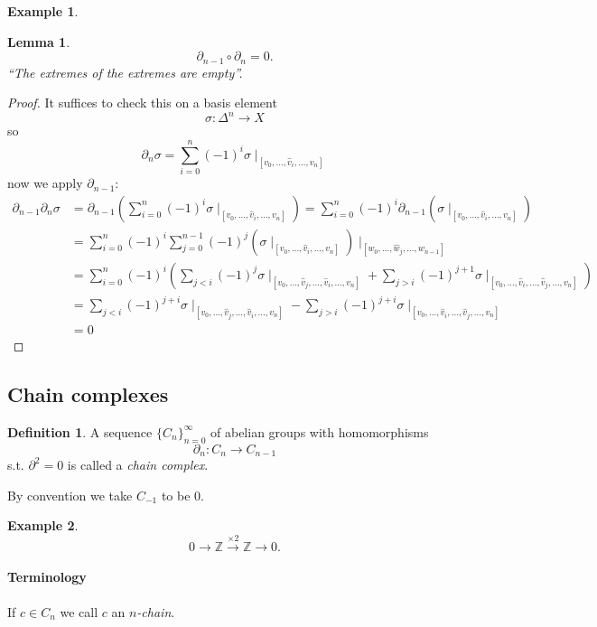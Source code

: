 \documentclass{article}
\newtheorem*{lem}{Lemma}
\theoremstyle{definition}
\newtheorem*{defn}{Definition}
\newtheorem*{ex}{Example}
\newcommand{\ZZ}{\mathbb{Z}}
\begin{document}
\begin{ex}
\end{ex}

\begin{lem}
\[\partial_{n-1} \circ \partial_n = 0.\]
``The extremes of the extremes are empty''.
\end{lem}
\begin{proof}
It suffices to check this on a basis element
\[\sigma \colon \Delta^n \to X\]
so
\[\partial_n \sigma = \sum_{i=0}^{n} (-1)^i \sigma \mid_{[v_0, \ldots, \hat{v}_i,\ldots,v_n]}\]
now we apply $\partial_{n-1}$:
\begin{align*}
\partial_{n-1} \partial_n \sigma &= \partial_{n-1} \left(\sum_{i=0}^{n} (-1)^i \sigma \mid_{[v_0, \ldots, \hat{v}_i,\ldots,v_n]} \right) = \sum_{i=0}^{n} (-1)^i \partial_{n-1} \left(\sigma \mid_{[v_0, \ldots, \hat{v}_i,\ldots,v_n]}\right)\\
&= \sum_{i=0}^{n} (-1)^i \sum_{j= 0}^{n-1} (-1)^j\left(\sigma \mid_{[v_0, \ldots, \hat{v}_i,\ldots,v_n]}\right)\mid_{[w_0, \ldots, \hat{w}_j,\ldots,w_{n-1}]}\\
&= \sum_{i=0}^{n} (-1)^i\left( \sum_{j< i} (-1)^j \sigma \mid_{[v_0, \ldots,\hat{v}_j, \ldots, \hat{v}_i,\ldots,v_n]} + \sum_{j> i} (-1)^{j+1} \sigma \mid_{[v_0, \ldots, \hat{v}_i,\ldots,\hat{v}_j,\ldots,v_n]}\right) \\
&= \sum_{j< i} (-1)^{j+i} \sigma \mid_{[v_0, \ldots,\hat{v}_j, \ldots, \hat{v}_i,\ldots,v_n]} - \sum_{j> i} (-1)^{j+i} \sigma \mid_{[v_0, \ldots, \hat{v}_i,\ldots,\hat{v}_j,\ldots,v_n]} \\
&= 0
\end{align*}
\end{proof}

\subsection{Chain complexes}
\begin{defn}
A sequence $\{C_n\}_{n=0}^{\infty}$ of abelian groups with homomorphisms
\[\partial_n\colon C_n\to C_{n-1}\]
 s.t. $\partial^2 = 0$ is called a \emph{chain complex}.
\end{defn}

By convention we take $C_{-1}$ to be 0.

\begin{ex}
\[0\to\ZZ\xrightarrow{\times 2} \ZZ \to 0.\]
\end{ex}

\paragraph{Terminology}
If $c\in C_n$ we call $c$ an \emph{$n$-chain}.
\end{document}
